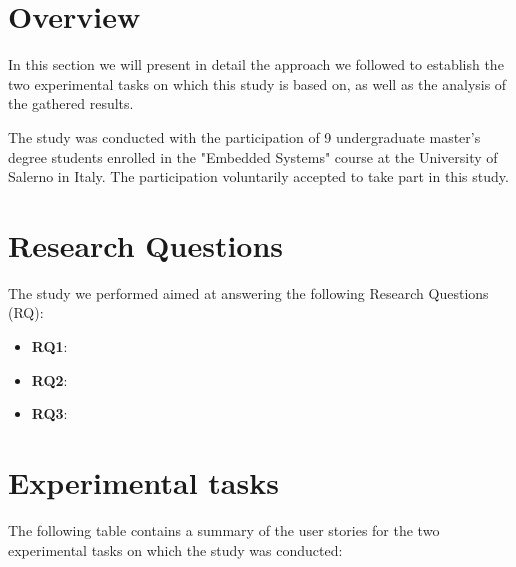 \section{Overview}
In this section we will present in detail the approach we followed to establish the two experimental tasks on which this study is based on, as well as the analysis of the gathered results.

The study was conducted with the participation of 9 undergraduate master's degree students enrolled in the "Embedded Systems" course at the University of Salerno in Italy. The participation voluntarily accepted to take part in this study.





\section{Research Questions}
The study we performed aimed at answering the following Research Questions (RQ):
\begin{itemize}
    \item \textbf{RQ1}:
    \item \textbf{RQ2}:
    \item \textbf{RQ3}:
\end{itemize}




\section{Experimental tasks}
The following table contains a summary of the user stories for the two experimental tasks on which the study was conducted:

